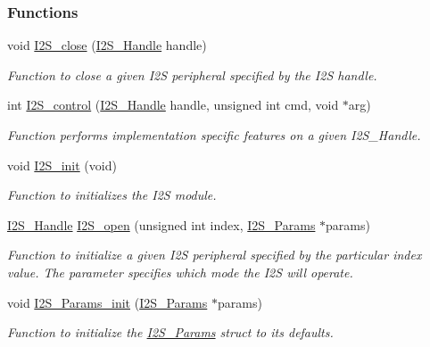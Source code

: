 \subsubsection*{Functions}
\begin{DoxyCompactItemize}
\item 
void \hyperlink{_i2_s_8h_a111a6b44f868cf90f7b25ced9f22ae1b}{I2\+S\+\_\+close} (\hyperlink{_i2_s_8h_aff0fad1efd0d9dc3c8d2cc87e73cd5a0}{I2\+S\+\_\+\+Handle} handle)
\begin{DoxyCompactList}\small\item\em Function to close a given I2\+S peripheral specified by the I2\+S handle. \end{DoxyCompactList}\item 
int \hyperlink{_i2_s_8h_a1af19b22e9036bee696b4e4efe4916b0}{I2\+S\+\_\+control} (\hyperlink{_i2_s_8h_aff0fad1efd0d9dc3c8d2cc87e73cd5a0}{I2\+S\+\_\+\+Handle} handle, unsigned int cmd, void $\ast$arg)
\begin{DoxyCompactList}\small\item\em Function performs implementation specific features on a given I2\+S\+\_\+\+Handle. \end{DoxyCompactList}\item 
void \hyperlink{_i2_s_8h_a79e8fdf40ee80c49b2cac09a3e428a82}{I2\+S\+\_\+init} (void)
\begin{DoxyCompactList}\small\item\em Function to initializes the I2\+S module. \end{DoxyCompactList}\item 
\hyperlink{_i2_s_8h_aff0fad1efd0d9dc3c8d2cc87e73cd5a0}{I2\+S\+\_\+\+Handle} \hyperlink{_i2_s_8h_aad4ce7cbdf38dc5597f5a92ad056ebc1}{I2\+S\+\_\+open} (unsigned int index, \hyperlink{struct_i2_s___params}{I2\+S\+\_\+\+Params} $\ast$params)
\begin{DoxyCompactList}\small\item\em Function to initialize a given I2\+S peripheral specified by the particular index value. The parameter specifies which mode the I2\+S will operate. \end{DoxyCompactList}\item 
void \hyperlink{_i2_s_8h_a961c116273a6e8d4581278b2666f13b5}{I2\+S\+\_\+\+Params\+\_\+init} (\hyperlink{struct_i2_s___params}{I2\+S\+\_\+\+Params} $\ast$params)
\begin{DoxyCompactList}\small\item\em Function to initialize the \hyperlink{struct_i2_s___params}{I2\+S\+\_\+\+Params} struct to its defaults. \end{DoxyCompactList}\item 

\end{DoxyCompactItemize}

